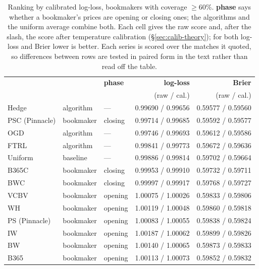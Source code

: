 \documentclass[12pt,a4paper,oneside]{report}
\renewcommand{\_}{\oldunderscore\allowbreak}
\theoremstyle{definition}
\theoremstyle{plain}
\theoremstyle{definition}   %
\begin{document}
\begin{table}[H]
\centering
\small
\begin{tabular}{@{}lllrr@{}}
\toprule
& & \textbf{phase} & \textbf{log-loss} & \textbf{Brier} \\
& & & (raw / cal.) & (raw / cal.) \\
\midrule
Hedge          & algorithm & ---     & 0.99690 / 0.99656 & 0.59577 / 0.59560 \\
PSC (Pinnacle) & bookmaker & closing & 0.99714 / 0.99685 & 0.59592 / 0.59577 \\
OGD            & algorithm & ---     & 0.99746 / 0.99693 & 0.59612 / 0.59586 \\
FTRL           & algorithm & ---     & 0.99841 / 0.99773 & 0.59672 / 0.59636 \\
Uniform        & baseline  & ---     & 0.99886 / 0.99814 & 0.59702 / 0.59664 \\
B365C          & bookmaker & closing & 0.99953 / 0.99910 & 0.59732 / 0.59711 \\
BWC            & bookmaker & closing & 0.99997 / 0.99917 & 0.59768 / 0.59727 \\
VC\_BV         & bookmaker & opening & 1.00075 / 1.00026 & 0.59833 / 0.59806 \\
WH             & bookmaker & opening & 1.00119 / 1.00048 & 0.59860 / 0.59818 \\
PS (Pinnacle)  & bookmaker & opening & 1.00083 / 1.00055 & 0.59838 / 0.59824 \\
IW             & bookmaker & opening & 1.00187 / 1.00062 & 0.59899 / 0.59826 \\
BW             & bookmaker & opening & 1.00140 / 1.00065 & 0.59873 / 0.59833 \\
B365           & bookmaker & opening & 1.00113 / 1.00073 & 0.59852 / 0.59832 \\
\bottomrule
\end{tabular}
\caption{Ranking by calibrated log-loss, bookmakers with coverage $\geq$60\%. \textbf{phase}
says whether a bookmaker's prices are opening or closing ones; the algorithms and the uniform
average combine both. Each cell gives the raw score and, after the slash, the score after
temperature calibration (\S\ref{sec:calib-theory}); for both log-loss and Brier lower is
better. Each series is scored over the matches it quoted, so differences between rows are
tested in paired form in the text rather than read off the table.}
\label{tab:ranking}
\end{table}
\end{document}

